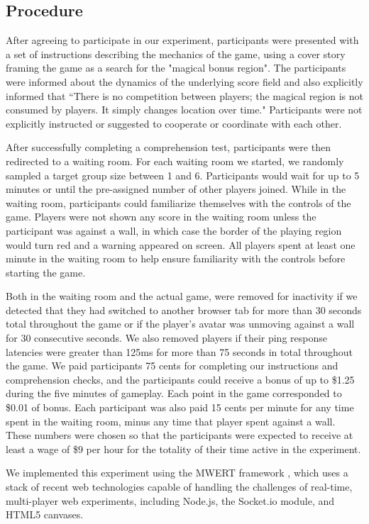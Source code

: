 \documentclass[12pt,letterpaper]{article}
\begin{document}
\subsection{Procedure}

After agreeing to participate in our experiment, participants were presented with a set of instructions describing the mechanics of the game, using a cover story framing the game as a search for the "magical bonus region".  
The participants were informed about the dynamics of the underlying score field and also explicitly informed that ``There is no competition between players; the magical region is not consumed by players. It simply changes location over time." 
Participants were not explicitly instructed or suggested to cooperate or coordinate with each other.

After successfully completing a comprehension test, participants were then redirected to a waiting room.
For each waiting room we started, we randomly sampled a target group size between 1 and 6.
Participants would wait for up to 5 minutes or until the pre-assigned number of other players joined.
While in the waiting room, participants could familiarize themselves with the controls of the game.  Players were not shown any score in
the waiting room unless the participant was against a wall, in which
case the border of the playing region would turn red and a warning appeared on screen.  All players spent at least one minute in the waiting room to help ensure familiarity with the controls before starting the game. 

Both in the waiting room and the actual game, were removed for inactivity if we detected that they had switched to another browser tab for more than 30 seconds total throughout the game or if the player's avatar was unmoving against a wall for 30 consecutive seconds.  
We also removed players if their ping response latencies were greater than 125ms for more than 75 seconds in total throughout the game.  
We paid participants 75 cents for completing our instructions and comprehension checks, and the participants could receive a bonus of up to \$1.25 during the five minutes of gameplay. Each point in the game corresponded to \$0.01 of bonus. Each participant was also paid 15 cents per minute for any time spent in the waiting room, minus any time that player spent against a wall.  These numbers were chosen so that the participants were expected to receive at least a wage of \$9 per hour for the totality of their time active in the
experiment.

We implemented this experiment using the MWERT framework \cite{hawkins_conducting_2014}, which uses a stack of recent web technologies capable of handling the challenges of real-time, multi-player web experiments, including Node.js, the Socket.io module, and HTML5 canvases.  
\end{document}
